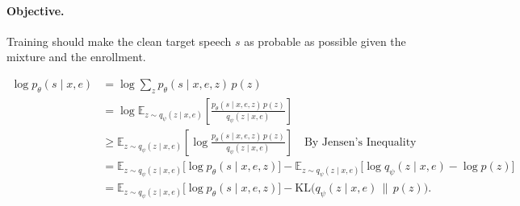 \paragraph{Objective.} Training should make the clean target speech $s$ as probable as possible given the mixture and the enrollment. 

\begin{equation}
  \begin{aligned}
  \log p_\theta(s \mid x, e)
    &= \log \sum_{z} p_\theta(s \mid x, e, z)\, p(z) \\
    &= \log \mathbb{E}_{z \sim q_\psi(z \mid x,
  e)}\!\left[\frac{p_\theta(s \mid x, e, z)\, p(z)}{q_\psi(z \mid x,
  e)}\right] \\
    &\ge \mathbb{E}_{z \sim q_\psi(z \mid x, e)}\!\left[\log\frac{p_\theta(s \mid x, e, z)\, p(z)}{q_\psi(z \mid x, e)}\right] \quad \text{By Jensen's Inequality} \\
    &= \mathbb{E}_{z \sim q_\psi(z \mid x, e)}\big[\log p_\theta(s \mid x, e, z)\big] - \mathbb{E}_{z \sim q_\psi(z \mid x, e)}\big[\log q_\psi(z \mid x, e) -  \log p(z) \big] \\
    &= \mathbb{E}_{z \sim q_\psi(z \mid x, e)}\big[\log p_\theta(s \mid x, e, z)\big] - \mathrm{KL}\big(q_\psi(z \mid x, e) \,\|\, p(z)\big).
  \end{aligned} 
  \label{eq:elbo}
  \end{equation}

